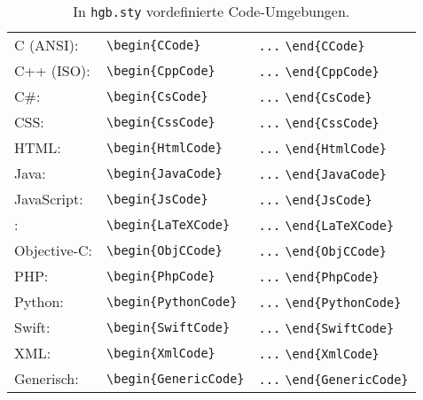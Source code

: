 \begin{table}
\caption{In \nolinkurl{hgb.sty} vordefinierte Code-Umgebungen.}
\label{tab:CodeUmgebungen}
\centering
\begin{tabular}{@{}lll@{}}
	\toprule
	C (ANSI): & \verb!\begin{CCode}! & \verb!...! \verb!\end{CCode}! \\
	C++ (ISO): & \verb!\begin{CppCode}! & \verb!...! \verb!\end{CppCode}! \\
	C\#: & \verb!\begin{CsCode}! & \verb!...! \verb!\end{CsCode}! \\
	CSS: & \verb!\begin{CssCode}! & \verb!...! \verb!\end{CssCode}! \\
	HTML: & \verb!\begin{HtmlCode}! & \verb!...! \verb!\end{HtmlCode}! \\
	Java: & \verb!\begin{JavaCode}! & \verb!...! \verb!\end{JavaCode}! \\
	JavaScript: & \verb!\begin{JsCode}! & \verb!...! \verb!\end{JsCode}! \\
	\latex: & \verb!\begin{LaTeXCode}! & \verb!...! \verb!\end{LaTeXCode}! \\
	Objective-C: & \verb!\begin{ObjCCode}! & \verb!...! \verb!\end{ObjCCode}! \\
	PHP: & \verb!\begin{PhpCode}! & \verb!...! \verb!\end{PhpCode}! \\
	Python: & \verb!\begin{PythonCode}! & \verb!...! \verb!\end{PythonCode}! \\
	Swift: & \verb!\begin{SwiftCode}! & \verb!...! \verb!\end{SwiftCode}! \\
	XML: & \verb!\begin{XmlCode}! & \verb!...! \verb!\end{XmlCode}! \\
	Generisch: & \verb!\begin{GenericCode}! & \verb!...! \verb!\end{GenericCode}! \\
	\bottomrule
\end{tabular}
\end{table}
